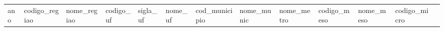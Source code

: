 \documentclass[
]{article}
\begin{document}
\begin{longtable}[]
{  >{\raggedleft\arraybackslash}p{}
  >{\raggedleft\arraybackslash}p{}
  >{\raggedleft\arraybackslash}p{}
  >{\raggedleft\arraybackslash}p{}
  >{\raggedleft\arraybackslash}p{}
  >{\raggedleft\arraybackslash}p{}
  >{\raggedleft\arraybackslash}p{}
  >{\raggedright\arraybackslash}p{}
  >{\raggedright\arraybackslash}p{}
  >{\raggedright\arraybackslash}p{}@{}}
\toprule\noalign{}
\begin{minipage}[b]{\linewidth}\raggedleft
ano
\end{minipage} & \begin{minipage}[b]{\linewidth}\raggedleft
codigo\_regiao
\end{minipage} & \begin{minipage}[b]{\linewidth}\raggedright
nome\_regiao
\end{minipage} & \begin{minipage}[b]{\linewidth}\raggedleft
codigo\_uf
\end{minipage} & \begin{minipage}[b]{\linewidth}\raggedright
sigla\_uf
\end{minipage} & \begin{minipage}[b]{\linewidth}\raggedright
nome\_uf
\end{minipage} & \begin{minipage}[b]{\linewidth}\raggedleft
cod\_municipio
\end{minipage} & \begin{minipage}[b]{\linewidth}\raggedright
nome\_munic
\end{minipage} & \begin{minipage}[b]{\linewidth}\raggedright
nome\_metro
\end{minipage} & \begin{minipage}[b]{\linewidth}\raggedleft
codigo\_meso
\end{minipage} & \begin{minipage}[b]{\linewidth}\raggedright
nome\_meso
\end{minipage} & \begin{minipage}[b]{\linewidth}\raggedleft
codigo\_micro
\end{minipage} & \begin{minipage}[b]{\linewidth}\raggedright

\end{minipage}
\end{longtable}
\end{document}
